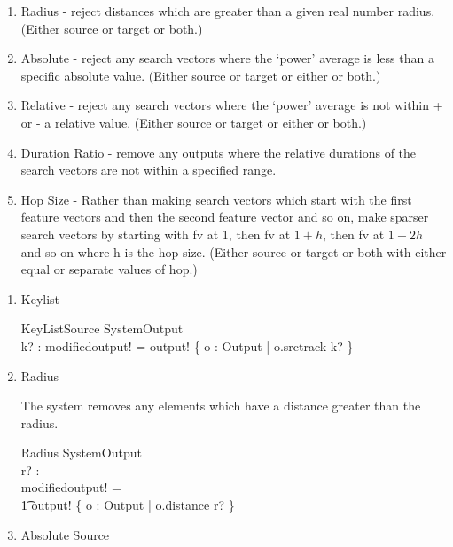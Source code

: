 \documentclass[11pt]{article}
\begin{document}
\begin{enumerate}
\begin{enumerate}
\item \textsf{Radius} - reject distances which are greater than a given real number radius. (Either source or target or both.) 

\item \textsf{Absolute} - reject any search vectors where the `power' average  is less than a specific absolute value. (Either source or target or either or both.) 

\item \textsf{Relative} - reject any search vectors where the `power' average  is not within  + or  - a relative value.  (Either source or target or either or both.) 

\item \textsf{Duration Ratio} - remove any outputs where the relative durations of the search vectors are not within a specified range. 

\item \textsf{Hop Size} - Rather than making search vectors which start with the first feature vectors and then the second feature vector and so on, make sparser search vectors by starting with fv at 1, then fv at $1 + h$, then fv at $1 + 2h$ and so on where h is the hop size. (Either source or target or both with either equal or separate values of hop.) 

\end{enumerate}

\begin{enumerate}

\item Keylist

\begin{schema}{KeyListSource}
	SystemOutput \\
	k? : \power \nat 
\where
	modifiedoutput! = output! \filter \{ o : Output |  o.srctrack \in k? \} 
\end{schema}	

\item Radius
	
The system removes any elements which have a distance greater than the radius.

\begin{schema}{Radius}
	SystemOutput \\
	r? : \R \\
\where
	modifiedoutput! = \\ 
	\t1 output! \filter \{ o : Output | o.distance \leq r? \}
\end{schema}

\item Absolute Source


\end{enumerate}
\end{enumerate}
\end{document}

